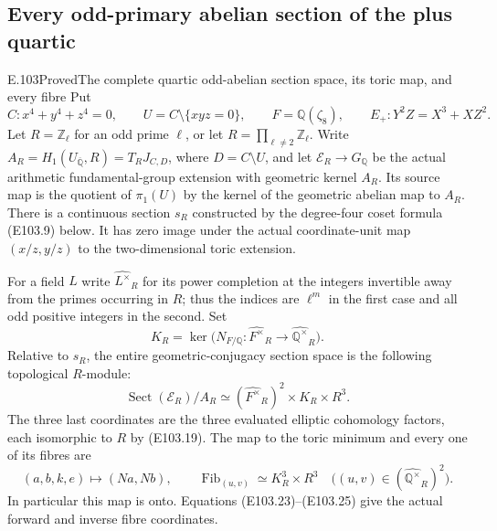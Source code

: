 \subsection*{Every odd-primary abelian section of the plus quartic}
\begin{statement}{E.103}{Proved}{The complete quartic odd-abelian section space, its toric map, and every fibre}
Put
\[
 C:x^4+y^4+z^4=0,\qquad U=C\setminus\{xyz=0\},\qquad
 F=\mathbb Q(\zeta _8),\qquad E_+:Y^2Z=X^3+XZ^2.
 \tag{E103.1}
\]
Let $R=\mathbb Z_\ell$ for an odd prime $\ell$, or let
$R=\prod_{\ell\ne2}\mathbb Z_\ell$.
Write $A_R=H_1(U_{\overline{\mathbb Q}},R)=T_RJ_{C,D}$, where
$D=C\setminus U$, and let $\mathcal E_R\to G_{\mathbb Q}$ be the
actual arithmetic fundamental-group extension with geometric kernel
$A_R$.  Its source map is the quotient of $\pi_1(U)$ by the kernel
of the geometric abelian map to $A_R$.
There is a continuous section $s_R$ constructed by the degree-four
coset formula (E103.9) below.  It has zero image under the actual
coordinate-unit map $(x/z,y/z)$ to the two-dimensional toric
extension.

For a field $L$ write $\widehat{L^\times}_R$ for its power completion
at the integers invertible away from the primes occurring in $R$;
thus the indices are $\ell^m$ in the first case and all odd positive
integers in the second.  Set
\[
 K_R=\ker\bigl(N_{F/\mathbb Q}:
       \widehat{F^\times}_R\longrightarrow
       \widehat{\mathbb Q^\times}_R\bigr).
 \tag{E103.2}
\]
Relative to $s_R$, the entire geometric-conjugacy section space is
the following topological $R$-module:
\[
 \operatorname{Sect}(\mathcal E_R)/A_R
   \simeq (\widehat{F^\times}_R)^2\times K_R\times R^3.
 \tag{E103.3}
\]
The three last coordinates are the three evaluated elliptic
cohomology factors, each isomorphic to $R$ by (E103.19).
The map to the toric minimum and every one of its fibres are
\[
 (a,b,k,e)\longmapsto (Na,Nb),\qquad
 \operatorname{Fib}_{(u,v)}\simeq K_R^3\times R^3
       \quad\bigl((u,v)\in(\widehat{\mathbb Q^\times}_R)^2\bigr).
 \tag{E103.4}
\]
In particular this map is onto.  Equations (E103.23)--(E103.25)
give the actual forward and inverse fibre coordinates.


\end{statement}
